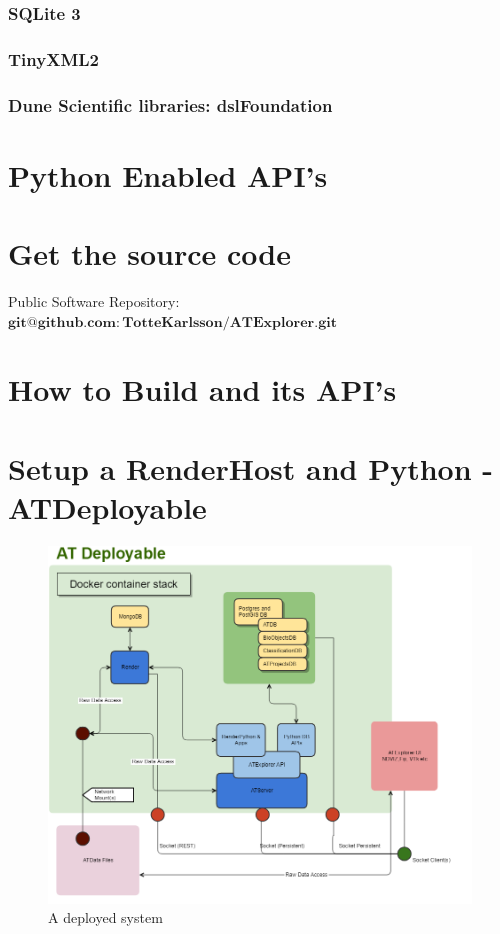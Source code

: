 \documentclass[11pt,fleqn]{book} %
\begin{document}
\begin{appendices}
\subsection{SQLite 3}
\subsection{TinyXML2}
\subsection{Dune Scientific libraries: dslFoundation}

\chapter{Python Enabled API's}

\chapter{Get the source code}

Public Software Repository: $\mathbf{git@github.com:TotteKarlsson/ATExplorer.git}$

\chapter{How to Build \ate  and its API's}

\chapter{Setup a RenderHost and Python - ATDeployable}

\begin{figure}[h]
\centering\includegraphics[scale=0.52]{ATDeployable_1}
\caption{A deployed system}
\end{figure}


\end{appendices}
\end{document}
